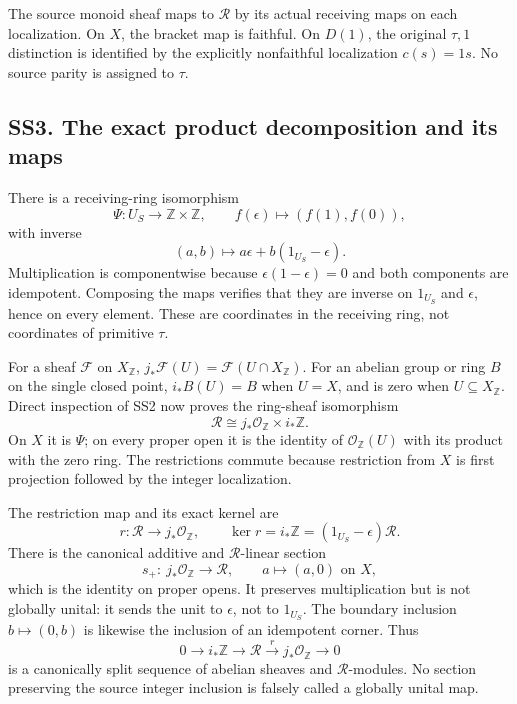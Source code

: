 The source monoid sheaf maps to \(\mathcal R\) by its actual receiving
maps on each localization. On \(X\), the bracket map is faithful. On
\(D(1)\), the original \(\tau,1\) distinction is identified by the
explicitly nonfaithful localization \(c(s)=1s\). No source parity is
assigned to \(\tau\).

\subsection{SS3. The exact product decomposition and its
maps}\label{ss3.-the-exact-product-decomposition-and-its-maps}

There is a receiving-ring isomorphism \[
 \Psi:U_S\longrightarrow\mathbb Z\times\mathbb Z,\qquad
 f(\epsilon)\longmapsto(f(1),f(0)),
\tag{SS3.1}
\] with inverse \[
 (a,b)\longmapsto a\epsilon+b(1_{U_S}-\epsilon).
\tag{SS3.2}
\] Multiplication is componentwise because \(\epsilon(1-\epsilon)=0\)
and both components are idempotent. Composing the maps verifies that
they are inverse on \(1_{U_S}\) and \(\epsilon\), hence on every
element. These are coordinates in the receiving ring, not coordinates of
primitive \(\tau\).

For a sheaf \(\mathcal F\) on \(X_{\mathbb Z}\),
\(j_*\mathcal F(U)=\mathcal F(U\cap X_{\mathbb Z})\). For an abelian
group or ring \(B\) on the single closed point, \(i_*B(U)=B\) when
\(U=X\), and is zero when \(U\subseteq X_{\mathbb Z}\). Direct
inspection of SS2 now proves the ring-sheaf isomorphism \[
 \boxed{\mathcal R\cong j_*\mathcal O_{\mathbb Z}\times i_*\mathbb Z.}
\tag{SS3.3}
\] On \(X\) it is \(\Psi\); on every proper open it is the identity of
\(\mathcal O_{\mathbb Z}(U)\) with its product with the zero ring. The
restrictions commute because restriction from \(X\) is first projection
followed by the integer localization.

The restriction map and its exact kernel are \[
 r:\mathcal R\longrightarrow j_*\mathcal O_{\mathbb Z},
\qquad
 \ker r=i_*\mathbb Z=(1_{U_S}-\epsilon)\mathcal R.
\tag{SS3.4}
\] There is the canonical additive and \(\mathcal R\)-linear section \[
 s_+:\ j_*\mathcal O_{\mathbb Z}\longrightarrow\mathcal R,
\qquad a\longmapsto(a,0)\text{ on }X,
\tag{SS3.5}
\] which is the identity on proper opens. It preserves multiplication
but is not globally unital: it sends the unit to \(\epsilon\), not to
\(1_{U_S}\). The boundary inclusion \(b\mapsto(0,b)\) is likewise the
inclusion of an idempotent corner. Thus \[
 0\longrightarrow i_*\mathbb Z\longrightarrow\mathcal R
 \xrightarrow r j_*\mathcal O_{\mathbb Z}\longrightarrow0
\tag{SS3.6}
\] is a canonically split sequence of abelian sheaves and
\(\mathcal R\)-modules. No section preserving the source integer
inclusion is falsely called a globally unital map.

